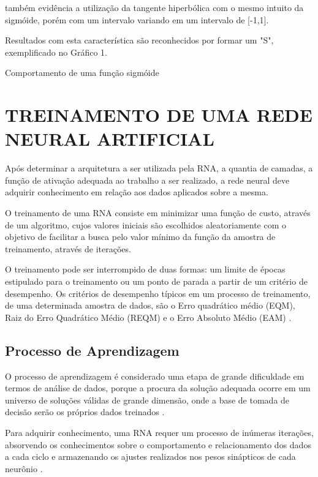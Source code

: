  também evidência a utilização da tangente hiperbólica com o mesmo intuito da sigmóide, porém com um intervalo variando em um intervalo de [-1,1].
\codigoPython\


Resultados com esta característica são reconhecidos por formar um "S", exemplificado no Gráfico 1.

\begin{grafico}[h]
	\centering
	\caption{Comportamento de uma função sigmóide}
	\label{sigmoide-graph}
\end{grafico}


\section{TREINAMENTO DE UMA REDE NEURAL ARTIFICIAL}\label{sec:rna-treinamento}
Após determinar a arquitetura a ser utilizada pela RNA, a quantia de camadas, a função de ativação adequada ao trabalho a ser realizado, a rede neural deve adquirir conhecimento em relação aos dados aplicados sobre a mesma.

O treinamento de uma RNA consiste em minimizar uma função de custo, através de um algoritmo, cujos valores iniciais são escolhidos aleatoriamente com o objetivo de facilitar a busca  pelo valor mínimo da função da amostra de treinamento, através de iterações. 

O treinamento pode ser interrompido de duas formas: um limite de épocas estipulado para o treinamento ou um ponto de parada a partir de um critério de desempenho. Os critérios de desempenho típicos em um processo de treinamento, de uma determinada amostra de dados, são o Erro quadrático médio (EQM), Raiz do Erro Quadrático Médio (REQM) e o Erro Absoluto Médio (EAM) \cite{gambogi}. 

\subsection{Processo de Aprendizagem}
O processo de aprendizagem é considerado uma etapa de grande dificuldade em termos de análise de dados, porque a procura da solução adequada ocorre em um universo de soluções válidas de grande dimensão, onde a base de tomada de decisão serão os próprios dados treinados \cite{medeiros}.
 
Para adquirir conhecimento, uma RNA requer um processo de inúmeras iterações, absorvendo os conhecimentos sobre o comportamento e relacionamento dos dados a cada ciclo e armazenando os ajustes realizados nos pesos sinápticos de cada neurônio \cite{neto}.

